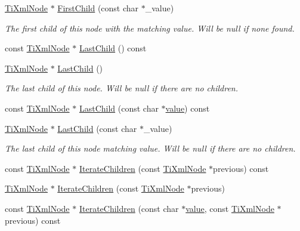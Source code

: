 \begin{DoxyCompactItemize}
\item 
\hyperlink{class_ti_xml_node}{Ti\+Xml\+Node} $\ast$ \hyperlink{class_ti_xml_node_abc8bf32be6419ec453a731868de19554}{First\+Child} (const char $\ast$\+\_\+value)
\begin{DoxyCompactList}\small\item\em The first child of this node with the matching \textquotesingle{}value\textquotesingle{}. Will be null if none found. \end{DoxyCompactList}\item 
const \hyperlink{class_ti_xml_node}{Ti\+Xml\+Node} $\ast$ \hyperlink{class_ti_xml_node_a6d671107e00cca1d28cb2d7f3a87a21e}{Last\+Child} () const 
\item 
\hyperlink{class_ti_xml_node}{Ti\+Xml\+Node} $\ast$ \hyperlink{class_ti_xml_node_a6432d2b2495f6caf9cb4278df706a031}{Last\+Child} ()
\begin{DoxyCompactList}\small\item\em The last child of this node. Will be null if there are no children. \end{DoxyCompactList}\item 
const \hyperlink{class_ti_xml_node}{Ti\+Xml\+Node} $\ast$ \hyperlink{class_ti_xml_node_acdd3fdc436aa7433023310a041e5e63f}{Last\+Child} (const char $\ast$\hyperlink{class_ti_xml_node_aead528b3cedc33c16a6c539872c7cc8b}{value}) const 
\item 
\hyperlink{class_ti_xml_node}{Ti\+Xml\+Node} $\ast$ \hyperlink{class_ti_xml_node_abad5bf1059c48127b958711ef89e8e5d}{Last\+Child} (const char $\ast$\+\_\+value)
\begin{DoxyCompactList}\small\item\em The last child of this node matching \textquotesingle{}value\textquotesingle{}. Will be null if there are no children. \end{DoxyCompactList}\item 
const \hyperlink{class_ti_xml_node}{Ti\+Xml\+Node} $\ast$ \hyperlink{class_ti_xml_node_aaef7ac3978c4bb1cc8a24ffae7bced75}{Iterate\+Children} (const \hyperlink{class_ti_xml_node}{Ti\+Xml\+Node} $\ast$previous) const 
\item 
\hyperlink{class_ti_xml_node}{Ti\+Xml\+Node} $\ast$ \hyperlink{class_ti_xml_node_a2358e747118fdbf0e467b1e4f7d03de1}{Iterate\+Children} (const \hyperlink{class_ti_xml_node}{Ti\+Xml\+Node} $\ast$previous)
\item 
const \hyperlink{class_ti_xml_node}{Ti\+Xml\+Node} $\ast$ \hyperlink{class_ti_xml_node_af2b86dbe25d3d26fa48180edc5e2a9fc}{Iterate\+Children} (const char $\ast$\hyperlink{class_ti_xml_node_aead528b3cedc33c16a6c539872c7cc8b}{value}, const \hyperlink{class_ti_xml_node}{Ti\+Xml\+Node} $\ast$previous) const 

\end{DoxyCompactItemize}
